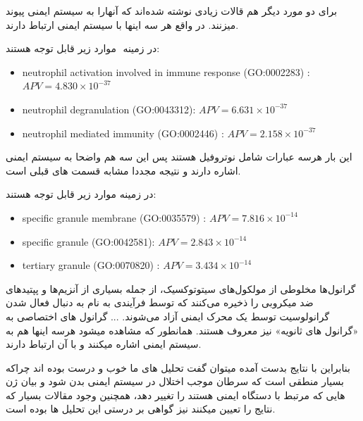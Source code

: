 \documentclass[12pt]{article}
\begin{document}
برای دو مورد دیگر هم قالات زیادی نوشته شده‌اند که آنهارا به سیستم ایمنی پیوند میزنند. در واقع هر سه اینها با سیستم ایمنی ارتباط دارند.



در زمینه ‌ موارد زیر قابل توجه هستند:
\begin{latin}
	\begin{itemize}
		\item  {neutrophil activation involved in immune response (GO:0002283)} : $APV =4.830 \times 10^{-37}$
		
		\item  {neutrophil degranulation (GO:0043312)}: $APV =6.631 \times 10^{-37}	$ 
		
		\item {neutrophil mediated immunity (GO:0002446)}  : $APV = 2.158 \times 10^{-37}$ 
	\end{itemize}
\end{latin}

این بار هرسه عبارات شامل نوتروفیل هستند پس این سه هم واضحا به سیستم ایمنی اشاره دارند و نتیجه مجددا مشابه قسمت های قبلی است.


در زمینه  موارد زیر قابل توجه هستند:
\begin{latin}
	\begin{itemize}
		\item  {specific granule membrane (GO:0035579)} : $APV =7.816 \times 10^{-14}$
		
		\item  {specific granule (GO:0042581)}: $APV =2.843 \times 10^{-14}	$ 
		
		\item {tertiary granule (GO:0070820)}  : $APV = 3.434 \times 10^{-14}$ 
	\end{itemize}
\end{latin}

گرانول‌ها مخلوطی از مولکول‌های سیتوتوکسیک، از جمله بسیاری از آنزیم‌ها و پپتیدهای ضد میکروبی را ذخیره می‌کنند که توسط فرآیندی به نام 
 به دنبال فعال شدن گرانولوسیت توسط یک محرک ایمنی آزاد می‌شوند. ... گرانول های اختصاصی به «گرانول های ثانویه» نیز معروف هستند. همانطور که مشاهده میشود هرسه اینها هم به سیستم ایمنی اشاره میکنند و با آن ارتباط دارند.
 
 بنابراین با نتایج بدست آمده میتوان گفت تحلیل های ما خوب و درست بوده اند چراکه بسیار منطقی است که سرطان موجب اختلال در سیستم ایمنی بدن شود و بیان ژن هایی که مرتبط با دستگاه ایمنی هستند را تغییر دهد، همچنین وجود مقالات بسیار که نتایج را تعیین میکنند نیز گواهی بر درستی این تحلیل ها بوده است.
\end{document}
